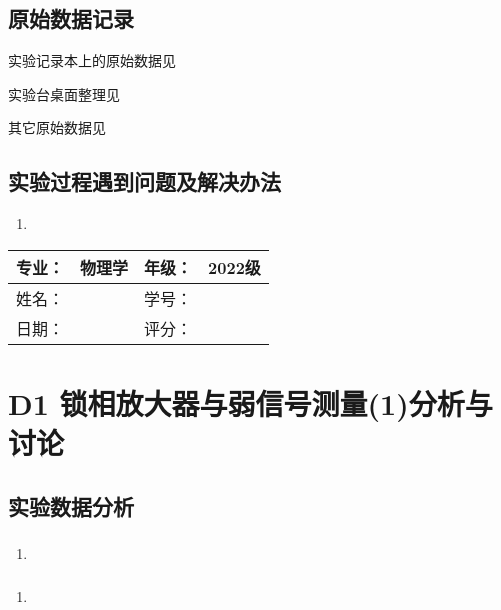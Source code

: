 \documentclass[dvipsnames, svgnames,a4paper,11pt]{article}
\begin{document}
	
	\clearpage
	\subsection{原始数据记录}
	实验记录本上的原始数据见%
	
	实验台桌面整理见%
	
	其它原始数据见%
	
	\subsection{实验过程遇到问题及解决办法}
	\begin{enumerate}
		\item 
	\end{enumerate}
	
	
	
	\clearpage
	
	\begin{table}
		\renewcommand\arraystretch{1.7}
		\begin{tabularx}{\textwidth}{|X|X|X|X|}
			\hline
			专业：& 物理学 &年级：& 2022级\\
			\hline
			姓名： &  & 学号：& \\
			\hline
			日期：&  & 评分： &\\
			\hline
		\end{tabularx}
	\end{table}
	
	\section{D1 锁相放大器与弱信号测量(1)\quad\heiti 分析与讨论}
	
	\subsection{实验数据分析}
	
	\subsubsection{}
	\begin{enumerate}
		\item 
	\end{enumerate}
	
	\subsubsection{}
	\begin{enumerate}
		\item 
	\end{enumerate}
	
\end{document}
